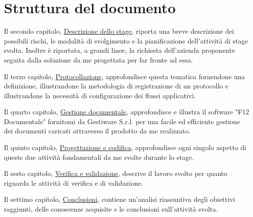 \section{Struttura del documento}

\begin{description}
    \item Il secondo capitolo, {\hyperref[cap:descrizione-stage]{Descrizione dello stage}}, riporta una breve descrizione dei possibili rischi, le modalità di svolgimento e la pianificazione dell'attività di stage svolta. Inoltre è riportata, a grandi linee, la richiesta dell'azienda proponente seguita dalla soluzione da me progettata per far fronte ad essa.
    
    \item Il terzo capitolo, {\hyperref[cap:protocollazione]{Protocollazione}}, approfondisce questa tematica fornendone una definizione, illustrandone la metodologia di registrazione di un protocollo e illustrandone la necessità di configurazione dei flussi applicativi.
    
    \item Il quarto capitolo, {\hyperref[cap:gestione-documentale]{Gestione documentale}}, approfondisce e illustra il software "F12 Documentale" fornitomi da Gestiware S.r.l. per una facile ed efficiente gestione dei documenti caricati attraverso il prodotto da me realizzato.
    
    \item Il quinto capitolo, {\hyperref[cap:progettazione-codifica]{Progettazione e codifica}}, approfondisce ogni singolo aspetto di queste due attività fondamentali da me svolte durante lo stage.
    
    \item Il sesto capitolo, {\hyperref[cap:verifica-validazione]{Verifica e validazione}}, descrive il lavoro svolto per quanto riguarda le attività di verifica e di validazione. 
    
    \item Il settimo capitolo, {\hyperref[cap:conclusioni]{Conclusioni}}, contiene un'analisi riassuntiva degli obiettivi raggiunti, delle conoscenze acquisite e le conclusioni sull'attività svolta.
\end{description}